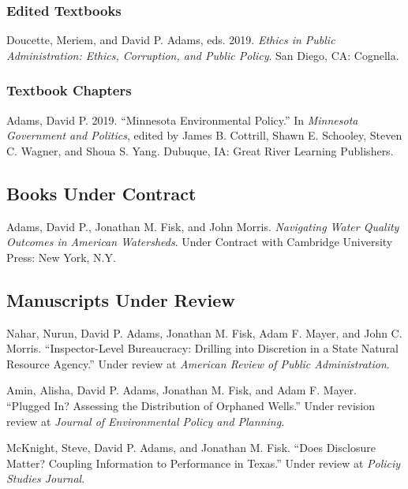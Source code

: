 \documentclass[12pt,letterpaper]{article}
\renewenvironment{itemize}{
  \begin{list}{}{
    \setlength{\leftmargin}{1.5em}
    \setlength{\itemsep}{0.25em}
    \setlength{\parskip}{0pt}
    \setlength{\parsep}{0.25em}
  }
}{
  \end{list}
}
\begin{document}
\subsubsection*{Edited Textbooks}
\begin{itemize}\leftmargin=2pt\itemindent=-15pt
  \item Doucette, Meriem, and David P. Adams, eds. 2019. \emph{Ethics in Public Administration: Ethics, Corruption, and Public Policy}. San Diego, CA: Cognella.
\end{itemize}

\subsubsection*{Textbook Chapters}
\begin{itemize}\leftmargin=2pt\itemindent=-15pt
  \item Adams, David P. 2019. ``Minnesota Environmental Policy.'' In \emph{Minnesota Government and Politics}, edited by James B. Cottrill, Shawn E. Schooley, Steven C. Wagner, and Shoua S. Yang. Dubuque, IA: Great River Learning Publishers.
\end{itemize}

\subsection*{Books Under Contract}

\begin{itemize}\leftmargin=2pt\itemindent=-15pt\leftmargin=2pt\itemindent=-15pt
  \item Adams, David P., Jonathan M. Fisk, and John Morris. \emph{Navigating Water Quality Outcomes in American Watersheds}. Under Contract with Cambridge University Press: New York, N.Y.
\end{itemize}

\subsection*{Manuscripts Under Review}
\begin{itemize}\leftmargin=2pt\itemindent=-15pt\leftmargin=2pt\itemindent=-15pt
  
  \item Nahar, Nurun, David P. Adams, Jonathan M. Fisk, Adam F. Mayer, and John C. Morris. ``Inspector-Level Bureaucracy: Drilling into Discretion in a State Natural Resource Agency.'' Under review at \emph{American Review of Public Administration}.
  
  \item Amin, Alisha, David P. Adams, Jonathan M. Fisk, and Adam F. Mayer. ``Plugged In? Assessing the Distribution of Orphaned Wells.'' Under revision review at \emph{Journal of Environmental Policy and Planning}.
  
  \item McKnight, Steve, David P. Adams, and Jonathan M. Fisk. ``Does Disclosure Matter? Coupling Information to Performance in Texas.'' Under review at \emph{Policiy Studies Journal}.

\end{itemize}
\end{document}
